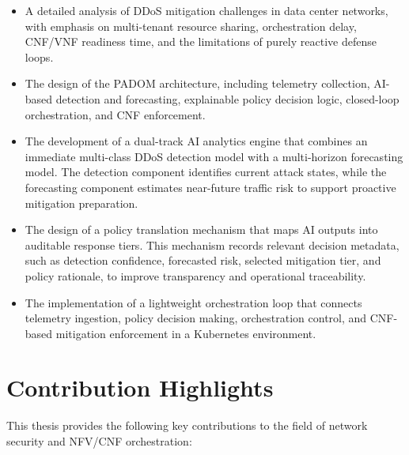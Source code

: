 \documentclass[12pt, a4paper, reqno, oneside]{book}
\newcommand{\padonap}{\textsc{PADOM}}
\begin{document}
\begin{itemize}
    \item A detailed analysis of DDoS mitigation challenges in data center
    networks, with emphasis on multi-tenant resource sharing, orchestration delay,
    CNF/VNF readiness time, and the limitations of purely reactive defense loops.

    \item The design of the \padonap{} architecture, including telemetry
    collection, AI-based detection and forecasting, explainable policy decision
    logic, closed-loop orchestration, and CNF enforcement.

    \item The development of a dual-track AI analytics engine that combines an
    immediate multi-class DDoS detection model with a multi-horizon forecasting
    model. The detection component identifies current attack states, while the
    forecasting component estimates near-future traffic risk to support proactive
    mitigation preparation.

    \item The design of a policy translation mechanism that maps AI outputs into
    auditable response tiers. This mechanism records relevant decision metadata,
    such as detection confidence, forecasted risk, selected mitigation tier, and
    policy rationale, to improve transparency and operational traceability.

    \item The implementation of a lightweight orchestration loop that connects
    telemetry ingestion, policy decision making, orchestration control, and
    CNF-based mitigation enforcement in a Kubernetes environment.

\end{itemize}

\section{Contribution Highlights}

This thesis provides the following key contributions to the field of network
security and NFV/CNF orchestration:
\end{document}
